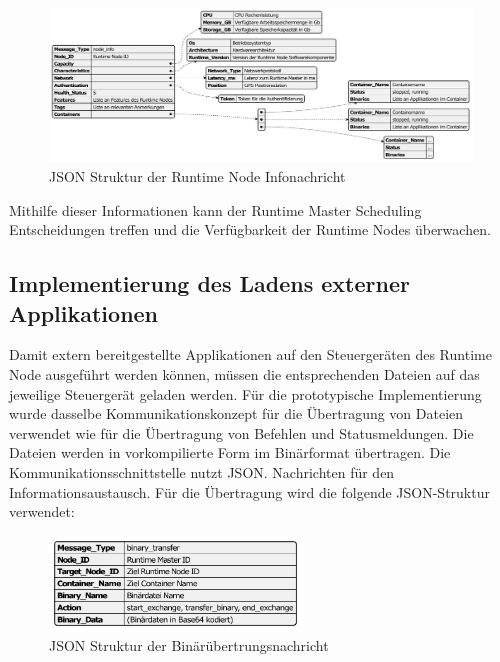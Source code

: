 \begin{figure}
	\centering
	\includegraphics[width=\textwidth]{./content/graphics/infoJSON.pdf}
	\caption{JSON Struktur der Runtime Node Infonachricht}
	\label{JSON info}
\end{figure}

Mithilfe dieser Informationen kann der Runtime Master Scheduling Entscheidungen treffen und die Verfügbarkeit der Runtime Nodes überwachen.

\subsection{Implementierung des Ladens externer Applikationen}
\label{Laden extene Applikationen Node}

Damit extern bereitgestellte Applikationen auf den Steuergeräten des Runtime Node ausgeführt werden können, müssen die entsprechenden Dateien auf das jeweilige Steuergerät geladen werden. Für die prototypische Implementierung wurde dasselbe Kommunikationskonzept für die Übertragung von Dateien verwendet wie für die Übertragung von Befehlen und Statusmeldungen. Die Dateien werden in vorkompilierte Form im Binärformat übertragen. Die Kommunikationsschnittstelle nutzt \gls{JSON}. Nachrichten für den Informationsaustausch. Für die Übertragung wird die folgende JSON-Struktur verwendet:

\begin{figure}[htbp]
	\centering
	\includegraphics[width=0.6\textwidth]{./content/graphics/binaryJSON.pdf}
	\caption{JSON Struktur der Binärübertrungsnachricht}
	\label{JSON binary}
\end{figure}

